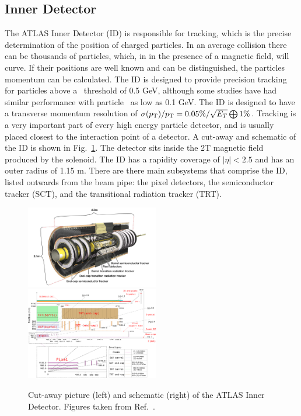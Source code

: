 {\subsection{Inner Detector}

The ATLAS Inner Detector (ID) is responsible for tracking, which is the precise determination of the position of charged particles. In an average collision there can be thousands of particles, which, in in the presence of a magnetic field, will curve. If their positions are well known and can be distinguished, the particles momentum can be calculated. The ID is designed to provide precision tracking for particles above a \pt\ threshold of 0.5 GeV, although some studies have had similar performance with particle \pt\ as low as 0.1 GeV. The ID is designed to have a transverse momentum resolution of $\sigma(\mbox{$p_{\mathrm{T}}$})/\mbox{$p_{\mathrm{T}}$}=0.05\%/\sqrt{E_{T}}\bigoplus1\%$.  Tracking is a very important part of every high energy particle detector, and is usually placed closest to the interaction point of a detector. A cut-away and schematic of the ID is shown in Fig.~\ref{fig:id}. The detector sits inside the 2T magnetic field produced by the solenoid. The ID has a rapidity coverage of $|\eta|<2.5$ and has an outer radius of 1.15 m. There are there main subsystems that comprise the ID, listed outwards from the beam pipe: the pixel detectors, the semiconductor tracker (SCT), and the transitional radiation tracker (TRT).

\begin{figure}
	\centerline{
		\includegraphics[width=0.52\textwidth]{figures/id.pdf} %
		\includegraphics[width=0.52\textwidth]{figures/id_schematic.pdf} %
	}
	\caption{ Cut-away picture (left) and schematic (right) of the ATLAS Inner Detector. Figures taken from Ref.~\cite{Aad:2008zzm}.}	
	\label{fig:id}
\end{figure}

}
